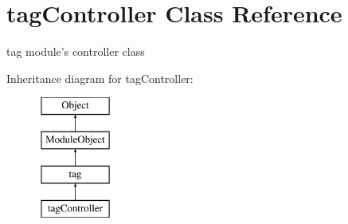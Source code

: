 \hypertarget{classtagController}{\section{tag\-Controller Class Reference}
\label{classtagController}
}


tag module's controller class  


Inheritance diagram for tag\-Controller\-:\begin{figure}[H]
\begin{center}
\leavevmode
\includegraphics[height=4.000000cm]{classtagController}
\end{center}
\end{figure}
